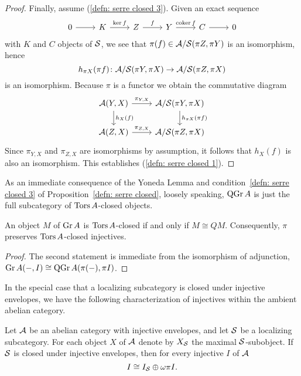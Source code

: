 \begin{proof}
  Finally, assume (\ref{defn: serre closed 3}).
  Given an exact sequence
  \[\begin{tikzcd}
  0 \arrow{r} & K \arrow{r}{\op{ker} f} & Z \arrow{r}{f} & Y \arrow{r}{\op{coker} f} & C \arrow{r} & 0
  \end{tikzcd}\]
  with \(K\) and \(C\) objects of \(\mathcal{S}\), we see that \(\pi(f) \in \mathcal{A}/\mathcal{S}(\pi Z, \pi Y)\) is an isomorphism, hence
  \[h_{\pi X}(\pi f) \colon \mathcal{A}/\mathcal{S}(\pi Y, \pi X) \to \mathcal{A}/\mathcal{S}(\pi Z,\pi X)\]
  is an isomorphism.
  Because \(\pi\) is a functor we obtain the commutative diagram
  \[\begin{tikzcd}
  \A(Y,X) \arrow{r}{\pi_{Y,X}}\arrow{d}{h_X(f)} & \A/\Serre(\pi Y, \pi X) \arrow{d}{h_{\pi X}(\pi f)}\\
  \A(Z,X) \arrow{r}{\pi_{Z,X}} & \A/\Serre(\pi Z,\pi X)
  \end{tikzcd}\]
  Since \(\pi_{Y,X}\) and \(\pi_{Z,X}\) are isomorphisms by assumption, it follows that \(h_X(f)\) is also an isomorphism.
  This establishes (\ref{defn: serre closed 1}).
\end{proof}

As an immediate consequence of the Yoneda Lemma and condition~\ref{defn: serre closed 3} of Proposition~\ref{defn: serre closed}, loosely speaking, \(\operatorname{QGr}A\) is just the full subcategory of \(\operatorname{Tors}A\)-closed objects.
\begin{corollary}
  An object \(M\) of \(\operatorname{Gr}A\) is \(\operatorname{Tors}A\)-closed if and only if \(M \cong QM\).
  Consequently, \(\pi\) preserves \(\operatorname{Tors}A\)-closed injectives.
\end{corollary}
\begin{proof}
  The second statement is immediate from the isomorphism of adjunction, \(\operatorname{Gr}A(-, I) \cong \operatorname{QGr}A(\pi(-), \pi{I})\).
\end{proof}

In the special case that a localizing subcategory is closed under injective envelopes, we have the following characterization of injectives within the ambient abelian category.
\begin{proposition}\label{prop: decomposition of injectives}
  Let \(\mathcal{A}\) be an abelian category with injective envelopes, and let \(\mathcal{S}\) be a localizing subcategory.
  For each object \(X\) of \(\mathcal{A}\) denote by \(X_{\mathcal{S}}\) the maximal \(\mathcal{S}\)-subobject.
  If \(\mathcal{S}\) is closed under injective envelopes, then for every injective \(I\) of \(\mathcal{A}\)
  \[I \cong I_{\mathcal{S}} \oplus \omega\pi{I}.\]
\end{proposition}

